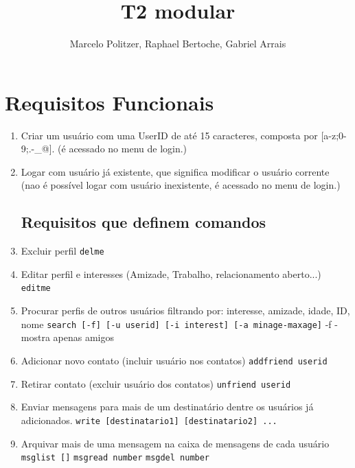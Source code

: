 \documentclass[a4paper,8pt]{article}
\title{T2 modular}
\author{Marcelo Politzer, Raphael Bertoche, Gabriel Arrais}
\begin{document}
\maketitle

\section{Requisitos Funcionais}


\begin{enumerate}
\item Criar um usuário com uma UserID de até 15 caracteres, composta por
[a-z;0-9;.-\_@]. (é acessado no menu de login.)

\item Logar com usuário já existente, que significa modificar o usuário
 corrente (nao é possível logar com usuário inexistente, é acessado no menu
 de login.)

\subsection{Requisitos que definem comandos}
\item Excluir perfil
 \newline\texttt{delme}

\item Editar perfil e interesses (Amizade, Trabalho, relacionamento aberto...)
\newline\texttt{editme}

\item Procurar perfis de outros usuários filtrando por: interesse, amizade,
 idade, ID, nome
 \newline\texttt{search [-f] [-u userid] [-i interest] [-a minage-maxage]}
 \newline-f - mostra apenas amigos

\item Adicionar novo contato (incluir usuário nos contatos)
 \newline\texttt{addfriend userid}

\item Retirar contato (excluir usuário dos contatos)
 \newline\texttt{unfriend userid}

\item Enviar mensagens para mais de um destinatário dentre os usuários já
 adicionados.
 \newline\texttt{write [destinatario1] [destinatario2] ...}

\item Arquivar mais de uma mensagem na caixa de mensagens de cada usuário
 \newline\texttt{msglist []}
 \newline\texttt{msgread number}
 \newline\texttt{msgdel number}

\end{enumerate}
\end{document}
